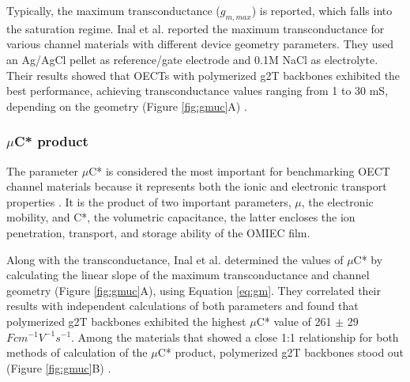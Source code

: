 Typically, the maximum transconductance ($g_{m,max}$) is reported, which falls into the saturation regime. Inal et al. reported the maximum transconductance for various channel materials with different device geometry parameters. They used an Ag/AgCl pellet as reference/gate electrode and 0.1M NaCl as electrolyte. Their results showed that OECTs with polymerized g2T backbones exhibited the best performance, achieving transconductance values ranging from 1 to 30 mS, depending on the geometry (Figure \ref{fig:gmuc}A) \cite{inalBenchmarkingOrganicMixed2017}.

\subsubsection{$\mu$C* product}

The parameter $\mu$C* is considered the most important for benchmarking OECT channel materials because it represents both the ionic and electronic transport properties %
\cite{inalBenchmarkingOrganicMixed2017}. %
It is the product of two important parameters, $\mu$, the electronic mobility, and C*, the volumetric capacitance, the latter encloses the ion penetration, transport, and storage ability of the OMIEC film.

Along with the transconductance, Inal et al. determined the values of $\mu$C* by calculating the linear slope of the maximum transconductance and channel geometry (Figure \ref{fig:gmuc}A), using Equation \ref{eq:gm}. They correlated their results with independent calculations of both parameters and found that polymerized g2T backbones exhibited the highest $\mu$C* value of 261 $\pm$ 29 $Fcm^{-1}V^{-1}s^{-1}$. Among the materials that showed a close 1:1 relationship for both methods of calculation of the $\mu$C* product, polymerized g2T backbones stood out (Figure \ref{fig:gmuc}B) \cite{inalBenchmarkingOrganicMixed2017}.
 
